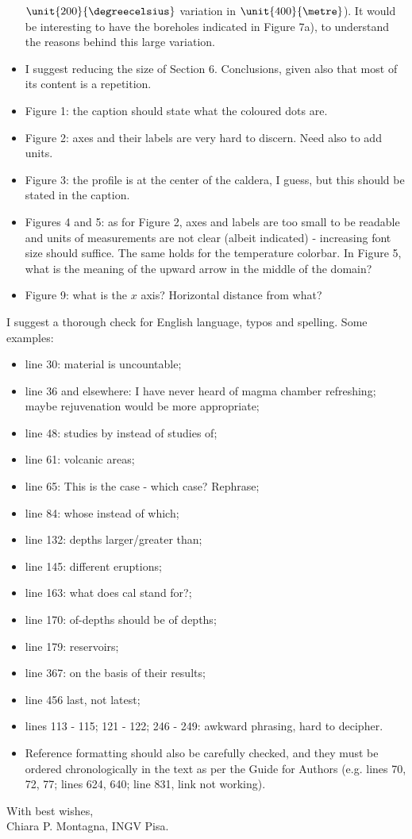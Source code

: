 \documentclass[a4paper,notitlepage]{article}
\begin{document}
\begin{itemize}
    $\unit{200}{\degreecelsius}$ variation in $\unit{400}{\metre}$). It would
    be interesting to have the boreholes indicated in Figure 7a), to understand
    the reasons behind this large variation.
  \item I suggest reducing the size of Section 6. Conclusions, given also that
    most of its content is a repetition.
  \item Figure 1: the caption should state what the coloured dots are.
  \item Figure 2: axes and their labels are very hard to discern. Need also to
    add units.
  \item Figure 3: the profile is at the center of the caldera, I guess, but this
    should be stated in the caption.
  \item Figures 4 and 5: as for Figure 2, axes and labels are too small to be
    readable and units of measurements are not clear (albeit indicated) -
    increasing font size should suffice. The same holds for the temperature
    colorbar. In Figure 5, what is the meaning of the upward arrow in the
    middle of the domain?
  \item Figure 9: what is the $x$ axis? Horizontal distance from what?
\end{itemize}

I suggest a thorough check for English language, typos and spelling. Some
examples:
\begin{itemize}
  \item line 30: material is uncountable;
  \item line 36 and elsewhere: I have never heard of magma chamber
    refreshing; maybe rejuvenation would be more appropriate;
  \item line 48: studies by instead of studies of;
  \item line 61: volcanic areas;
  \item line 65: This is the case - which case? Rephrase;
  \item line 84: whose instead of which;
  \item line 132: depths larger/greater than;
  \item line 145: different eruptions;
  \item line 163: what does cal stand for?;
  \item line 170: of-depths should be of depths;
  \item line 179: reservoirs;
  \item line 367: on the basis of their results;
  \item line 456 last, not latest;
  \item lines 113 - 115; 121 - 122; 246 - 249: awkward phrasing, hard to
    decipher.
  \item Reference formatting should also be carefully checked, and they must be
    ordered chronologically in the text as per the Guide for Authors (e.g.
    lines 70, 72, 77; lines 624, 640; line 831, link not working).
\end{itemize}

\vspace{1cm}

With best wishes, \\
Chiara P. Montagna, INGV Pisa.

% 
\end{document}
